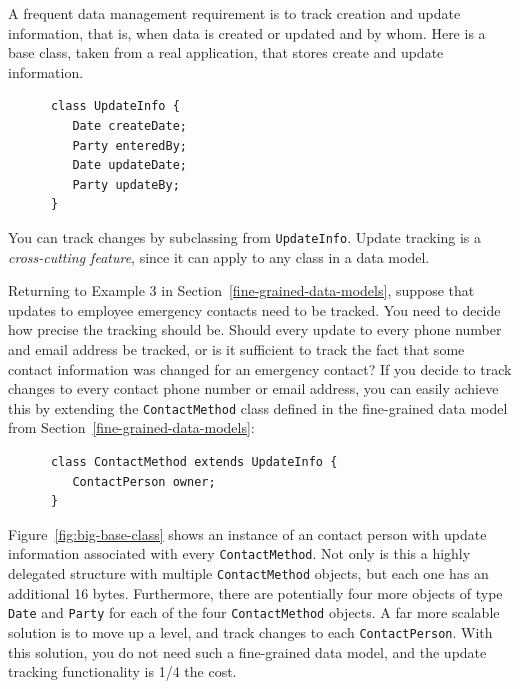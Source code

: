 \begin{example} 

A frequent data management requirement is to track creation and update information, that is, when data is created or updated and by whom.  Here is a base class, taken from a real application, that stores create and update information.  
\ttfamily
\begin{verbatim}
      class UpdateInfo {
         Date createDate;
         Party enteredBy;
         Date updateDate;
         Party updateBy;
      }
\end{verbatim}
\normalfont
You can track changes by subclassing from \texttt{UpdateInfo}. Update tracking is a \textit{cross-cutting feature}, since it can apply to any class in a data model.

\end{example}
Returning to Example 3 in Section~\ref{fine-grained-data-models}, suppose that updates to employee emergency contacts need to be tracked. You need to decide how precise the tracking should be. Should every update to every phone number and email address be tracked, or is it sufficient to track the fact that some contact information was changed for an emergency contact? If you decide to track changes to every contact phone number or email address, you can easily achieve this by extending the \texttt{ContactMethod} class defined in the fine-grained data model from Section~\ref{fine-grained-data-models}:
\ttfamily
\begin{verbatim}
      class ContactMethod extends UpdateInfo {
         ContactPerson owner;
      }
\end{verbatim}
\normalfont
Figure~\ref{fig:big-base-class} shows an instance of an contact person with update information associated with every \texttt{ContactMethod}. Not only is this a highly delegated structure with multiple \texttt{ContactMethod} objects, but each one has an additional 16 bytes. Furthermore, there are potentially four more objects of type \texttt{Date} and \texttt{Party} for each of the four \texttt{ContactMethod} objects. A far more scalable solution is to move up a level, and track changes to each \texttt{ContactPerson}. With this solution, you do not need such a fine-grained data model, and the update tracking functionality is 1/4 the cost.
